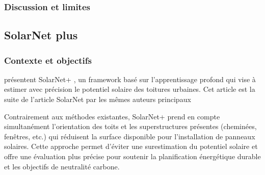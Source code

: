 {{{{\subsubsection{Discussion et limites}

\subsection{SolarNet plus}
\label{subsec:solar_net_plus}

\subsubsection{Contexte et objectifs}
\par{\citeauthor{li_deep_2024} présentent SolarNet+ \cite{li_deep_2024}, un framework basé sur l'apprentissage profond qui vise à estimer avec précision le potentiel solaire des toitures urbaines. Cet article est la suite de l'article \cite{li_solarnet_2023} SolarNet par les mêmes auteurs principaux}
\par{Contrairement aux méthodes existantes, SolarNet+ prend en compte simultanément l'orientation des toits et les superstructures présentes (cheminées, fenêtres, etc.) qui réduisent la surface disponible pour l'installation de panneaux solaires. Cette approche permet d'éviter une surestimation du potentiel solaire et offre une évaluation plus précise pour soutenir la planification énergétique durable et les objectifs de neutralité carbone.}

}}}}
